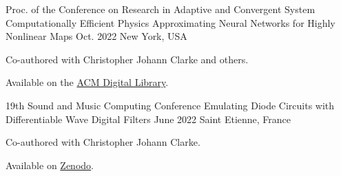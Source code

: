 

\begin{cventries}

  \cventry
    {Proc. of the Conference on Research in Adaptive and Convergent System} %
    {Computationally Efficient Physics Approximating Neural Networks for Highly Nonlinear Maps} %
    {Oct. 2022} %
    {New York, USA} %
    {
      \begin{cvitems} %
        \item {Co-authored with Christopher Johann Clarke and others.}
        \item {Available on the \href{https://dl.acm.org/doi/10.1145/3538641.3561501}{ACM Digital Library}.}
      \end{cvitems}
    }


  \cventry
    {19th Sound and Music Computing Conference} %
    {Emulating Diode Circuits with Differentiable Wave Digital Filters} %
    {June 2022} %
    {Saint Etienne, France} %
    {
      \begin{cvitems} %
        \item {Co-authored with Christopher Johann Clarke.}
        \item {Available on \href{https://zenodo.org/record/6566846}{Zenodo}.}
      \end{cvitems}
    }


\end{cventries}
